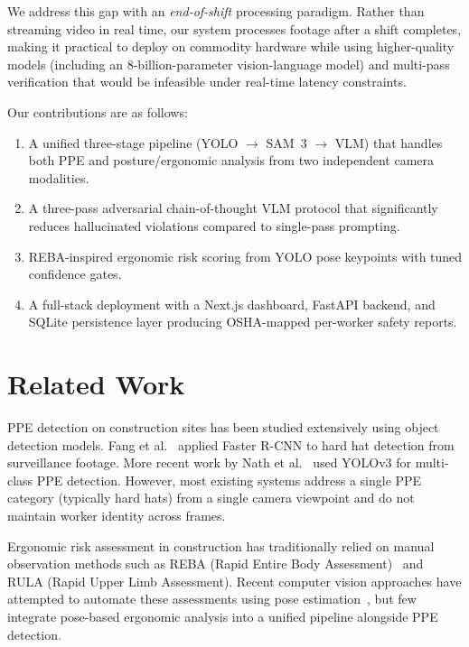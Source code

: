 \documentclass[11pt, twocolumn]{article}
\begin{document}
We address this gap with an \textit{end-of-shift} processing paradigm. Rather than streaming video in real time, our system processes footage after a shift completes, making it practical to deploy on commodity hardware while using higher-quality models (including an 8-billion-parameter vision-language model) and multi-pass verification that would be infeasible under real-time latency constraints.

Our contributions are as follows:
\begin{enumerate}[nosep, leftmargin=*]
    \item A unified three-stage pipeline (YOLO $\rightarrow$ SAM~3 $\rightarrow$ VLM) that handles both PPE and posture/ergonomic analysis from two independent camera modalities.
    \item A three-pass adversarial chain-of-thought VLM protocol that significantly reduces hallucinated violations compared to single-pass prompting.
    \item REBA-inspired ergonomic risk scoring from YOLO pose keypoints with tuned confidence gates.
    \item A full-stack deployment with a Next.js dashboard, FastAPI backend, and SQLite persistence layer producing OSHA-mapped per-worker safety reports.
\end{enumerate}

\section{Related Work}

PPE detection on construction sites has been studied extensively using object detection models. Fang et al.~\cite{fang2018} applied Faster R-CNN to hard hat detection from surveillance footage. More recent work by Nath et al.~\cite{nath2020} used YOLOv3 for multi-class PPE detection. However, most existing systems address a single PPE category (typically hard hats) from a single camera viewpoint and do not maintain worker identity across frames.

Ergonomic risk assessment in construction has traditionally relied on manual observation methods such as REBA (Rapid Entire Body Assessment)~\cite{hignett2000} and RULA (Rapid Upper Limb Assessment). Recent computer vision approaches have attempted to automate these assessments using pose estimation~\cite{yan2017}, but few integrate pose-based ergonomic analysis into a unified pipeline alongside PPE detection.
\end{document}
